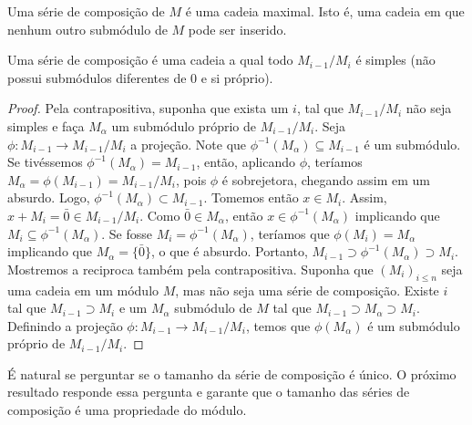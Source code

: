 \begin{definition}
	\label{loc:def_3_:_cadeia_de_submódulos.definição_série_de_composição}
	Uma série de composição de $M$ é uma cadeia maximal. Isto é, uma cadeia em que nenhum outro submódulo de $M$ pode ser inserido.
\end{definition}
\begin{proposition}
	\label{loc:def_3_:_cadeia_de_submódulos.definição_equivalente}
	Uma série de composição é uma cadeia a qual todo $M_{i-1}/M_{i}$ é simples (não possui submódulos diferentes de 0 e si próprio).
	\begin{proof}

		Pela contrapositiva, suponha que exista um $i$, tal que $M_{i-1}/M_i$ não seja simples e faça $M_{\alpha}$ um submódulo próprio de $M_{i-1}/M_i$.
		Seja $\phi:M_{i-1}\to M_{i-1}/M_i$ a projeção. Note que $\phi ^{-1}(M_{\alpha})\subseteq M_{i-1}$  é um submódulo. Se tivéssemos $\phi ^{-1}(M_{\alpha})=M_{i-1}$, então, aplicando $\phi$, teríamos $M_{\alpha}=\phi(M_{i-1})=M_{i-1}/M_{i}$, pois $\phi$ é sobrejetora, chegando assim em um absurdo. Logo, $\phi ^{-1}(M_{\alpha}) \subset M_{i-1}$.
		Tomemos então $x \in M_{i}$. Assim, $x+M_{i}=\bar{0}\in M_{i-1}/M_{i}$. Como $\bar{0}\in M_{\alpha}$, então $x \in \phi ^{-1}(M_{\alpha})$ implicando que $M_{i}\subseteq \phi ^{-1}(M_{\alpha})$. Se fosse $M_{i}=\phi ^{-1}(M_{\alpha})$, teríamos que $\phi(M_{i})=M_{\alpha}$ implicando que $M_{\alpha}=\{ \bar{0} \}$, o que é absurdo. Portanto, $M_{i-1}\supset \phi ^{-1}(M_{\alpha})\supset M_{i}$.
		Mostremos a reciproca também pela contrapositiva. Suponha que $(M_{i})_{i\leq n}$ seja uma cadeia em um módulo $M$, mas não seja uma série de composição. Existe $i$ tal que $M_{i-1}\supset M_{i}$ e um $M_{\alpha}$ submódulo de $M$ tal que $M_{i-1} \supset M_{\alpha} \supset M_{i}$.
		Definindo a projeção $\phi:M_{i-1}\to M_{i-1}/M_{i}$, temos que $\phi(M_{\alpha})$ é um submódulo próprio de $M_{i-1}/M_{i}$.
	\end{proof}
\end{proposition}
É natural se perguntar se o tamanho da série de composição é único. O próximo resultado responde essa pergunta e garante que o tamanho das séries de composição é uma propriedade do módulo.
